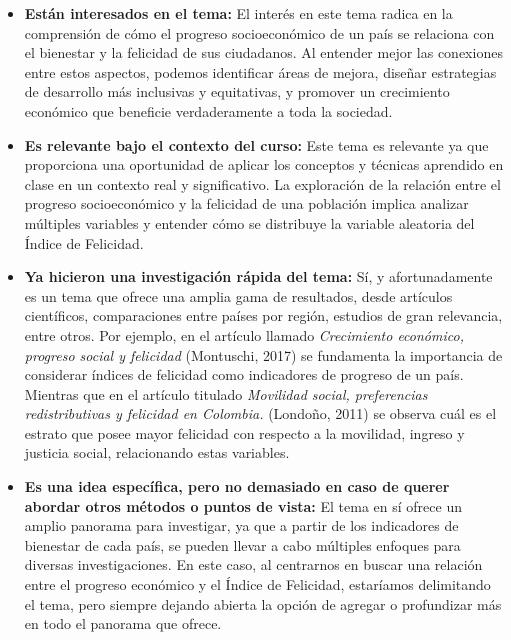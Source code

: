 \begin{itemize}
    \item \textbf{Están interesados en el tema:} El interés en este tema radica en la comprensión de cómo el progreso socioeconómico de un país se relaciona con el bienestar y la felicidad de sus ciudadanos. Al entender mejor las conexiones entre estos aspectos, podemos identificar áreas de mejora, diseñar estrategias de desarrollo más inclusivas y equitativas, y promover un crecimiento económico que beneficie verdaderamente a toda la sociedad.

    \item \textbf{Es relevante bajo el contexto del curso:} Este tema es relevante ya que proporciona una oportunidad de aplicar los conceptos y técnicas aprendido en clase en un contexto real y significativo. La exploración de la relación entre el progreso socioeconómico y la felicidad de una población implica analizar múltiples variables y entender cómo se distribuye la variable aleatoria del Índice de Felicidad.

    \item \textbf{Ya hicieron una investigación rápida del tema:} Sí, y afortunadamente es un tema que ofrece una amplia gama de resultados, desde artículos científicos, comparaciones entre países por región, estudios de gran relevancia, entre otros. Por ejemplo, en el artículo llamado \textit{Crecimiento económico, progreso social y felicidad} (Montuschi, 2017) se fundamenta la importancia de considerar índices de felicidad como indicadores de progreso de un país. Mientras que en el artículo titulado \textit{Movilidad social, preferencias redistributivas y felicidad en Colombia.} (Londoño, 2011) se observa cuál es el estrato que posee mayor felicidad con respecto a la movilidad, ingreso y justicia social, relacionando estas variables.
    
    \item \textbf{Es una idea específica, pero no demasiado en caso de querer abordar otros métodos o puntos de vista:} El tema en sí ofrece un amplio panorama para investigar, ya que a partir de los indicadores de bienestar de cada país, se pueden llevar a cabo múltiples enfoques para diversas investigaciones. En este caso, al centrarnos en buscar una relación entre el progreso económico y el Índice de Felicidad, estaríamos delimitando el tema, pero siempre dejando abierta la opción de agregar o profundizar más en todo el panorama que ofrece. 
\end{itemize}

